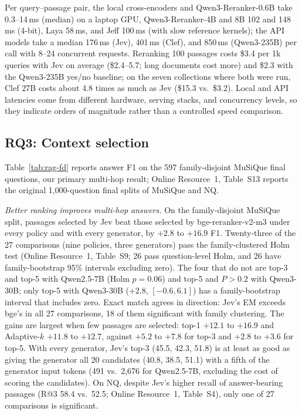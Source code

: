 Per query--passage pair, the local cross-encoders and Qwen3-Reranker-0.6B take 0.3--14\,ms (median) on a laptop GPU, Qwen3-Reranker-4B and 8B 102 and 148\,ms (4-bit), Laya 58\,ms, and Jeff 100\,ms (with slow reference kernels); the API models take a median 176\,ms (Jev), 401\,ms (Clef), and 850\,ms (Qwen3-235B) per call with 8--24 concurrent requests. Reranking 100 passages costs \$3.4 per 1k queries with Jev on average (\$2.4--5.7; long documents cost more) and \$2.3 with the Qwen3-235B yes/no baseline; on the seven collections where both were run, Clef 27B costs about 4.8 times as much as Jev (\$15.3 vs.\ \$3.2). Local and API latencies come from different hardware, serving stacks, and concurrency levels, so they indicate orders of magnitude rather than a controlled speed comparison.




\subsection{RQ3: Context selection}

Table~\ref{tab:rag-fd} reports answer F1 on the 597 family-disjoint MuSiQue final questions, our primary multi-hop result; Online Resource~1, Table~S13 reports the original 1{,}000-question final splits of MuSiQue and NQ.

\emph{Better ranking improves multi-hop answers.} On the family-disjoint MuSiQue split, passages selected by Jev beat those selected by bge-reranker-v2-m3 under every policy and with every generator, by $+2.8$ to $+16.9$ F1. Twenty-three of the 27 comparisons (nine policies, three generators) pass the family-clustered Holm test (Online Resource~1, Table~S9; 26 pass question-level Holm, and 26 have family-bootstrap 95\% intervals excluding zero). The four that do not are top-3 and top-5 with Qwen2.5-7B (Holm $p=0.06$) and top-5 and $P>0.2$ with Qwen3-30B; only top-5 with Qwen3-30B ($+2.8$, $[-0.6,6.1]$) has a family-bootstrap interval that includes zero. Exact match agrees in direction: Jev's EM exceeds bge's in all 27 comparisons, 18 of them significant with family clustering. The gains are largest when few passages are selected: top-1 $+12.1$ to $+16.9$ and Adaptive-$k$ $+11.8$ to $+12.7$, against $+5.2$ to $+7.8$ for top-3 and $+2.8$ to $+3.6$ for top-5. With every generator, Jev's top-3 (45.5, 42.3, 51.8) is at least as good as giving the generator all 20 candidates (40.8, 38.5, 51.1) with a fifth of the generator input tokens (491 vs.\ 2{,}676 for Qwen2.5-7B, excluding the cost of scoring the candidates). On NQ, despite Jev's higher recall of answer-bearing passages (R@3 58.4 vs.\ 52.5; Online Resource~1, Table~S4), only one of 27 comparisons is significant.

